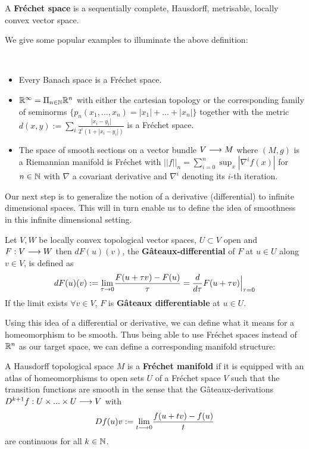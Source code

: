 \begin{definition}
  A \textbf{Fréchet space} is a sequentially complete, Hausdorff, metrisable, locally convex vector space.
\end{definition}

We give some popular examples to illuminate the above definition:

\begin{example}~
\begin{itemize}
  \item Every Banach space is a Fréchet space.
  \item $\mathbb{R}^\infty = \Pi_{n\in \mathbb{N}} \mathbb{R}^n$ with either the cartesian topology or the corresponding family of seminorms $\{p_n(x_1,...,x_n) = |x_1| + ... + |x_n| \}$ together with the metric $d(x,y) := \sum_i \frac{|x_i - y_i|}{2^i (1+|x_i - y_i|)}$ is a Fréchet space.
  \item The space of smooth sections on a vector bundle $V \longrightarrow M$ where $(M,g)$ is a Riemannian manifold is Fréchet with $||f||_n = \sum_{i=0}^n \sup_x |\nabla^i f(x)|$ for $n\in \mathbb{N}$ with $\nabla$ a covariant derivative and $\nabla^i$ denoting its $i$-th iteration.
\end{itemize}
\end{example}

Our next step is to generalize the notion of a derivative (differential) to infinite dimensional spaces. This will in turn enable us to define the idea of smoothness in this infinite dimensional setting.

\begin{definition}
  Let $V,W$ be locally convex topological vector spaces, $U\subset V$ open and $F:V \longrightarrow W$ then $dF(u)(v)$, the \textbf{Gâteaux-differential} of $F$ at $u\in U$ along $v\in V$, is defined as
  $$dF(u)(v) := \underset{\tau \rightarrow 0}{\lim} \frac{F(u+\tau v) - F(u)}{\tau} = \frac{d }{d \tau} F(u+\tau v) \Big|_{\tau = 0}$$
  If the limit exists $\forall v \in V$, $F$ is \textbf{Gâteaux differentiable} at $u \in U$.
\end{definition}

Using this idea of a differential or derivative, we can define what it means for a homeomorphism to be smooth. Thus being able to use Fréchet spaces instead of $\mathbb{R}^n$ as our target space, we can define a corresponding manifold structure:

\begin{definition}
\label{def:Frechet_manifolds}
  A Hausdorff topological space $M$ is a \textbf{Fréchet manifold} if it is equipped with an atlas of homeomorphisms to open sets $U$ of a Fréchet space $V$ such that the transition functions are smooth in the sense that the Gâteaux-derivations $D^{k+1}f:U \times ... \times U \longrightarrow V$ with
  $$ Df(u)v := \underset{t \longrightarrow 0}{\lim} \frac{f(u+tv)-f(u)}{t} $$
  are continuous for all $k\in \mathbb{N}$.
\end{definition}

